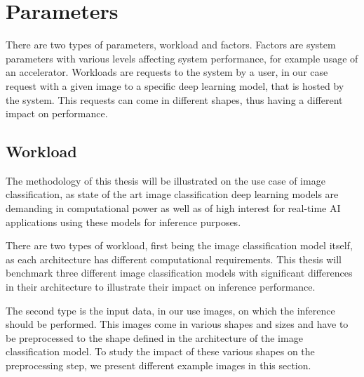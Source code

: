 



\section{Parameters}
\label{chap:parameters}
There are two types of parameters, workload and factors.
Factors are system parameters with various levels affecting system performance, for example usage of an accelerator.
Workloads are requests to the system by a user, in our case request with a given image to a specific deep learning model, that is hosted by the system.
This requests can come in different shapes, thus having a different impact
on performance.
\subsection{Workload}
\label{chap:workload}
The methodology of this thesis will be illustrated on the use case of image classification, as state of the art image classification deep learning models are demanding in computational power as well as of high interest for real-time AI applications using these models for inference purposes.

There are two types of workload, first being the image classification model itself, as each architecture has different computational requirements.
This thesis will benchmark three different image classification models with significant differences in their architecture to illustrate their impact on inference performance.

The second type is the input data, in our use images, on which the inference should be performed.
This images come in various shapes and sizes and have to be preprocessed to the shape defined in the architecture of the image classification model.
To study the impact of these various shapes on the preprocessing step, we present different example images in this section.

